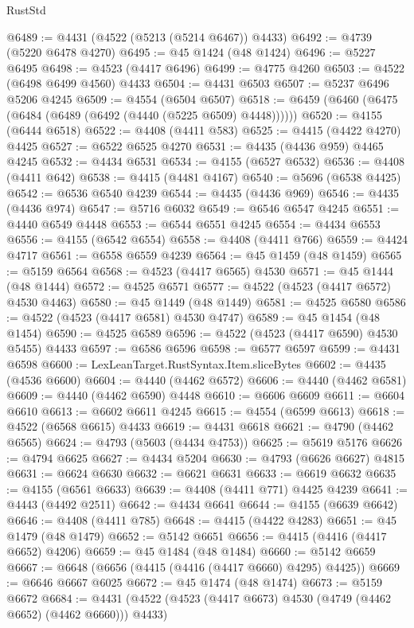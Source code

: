 \begin{lexlean}{RustStd}
\begin{coremodule}
@6489 := @4431 (@4522 (@5213 (@5214 @6467)) @4433)
@6492 := @4739 (@5220 @6478 @4270)
@6495 := @45 @1424 (@48 @1424)
@6496 := @5227 @6495
@6498 := @4523 (@4417 @6496)
@6499 := @4775 @4260
@6503 := @4522 (@6498 @6499 @4560) @4433
@6504 := @4431 @6503
@6507 := @5237 @6496 @5206 @4245
@6509 := @4554 (@6504 @6507)
@6518 := @6459 (@6460 (@6475 (@6484 (@6489 (@6492 (@4440 (@5225 @6509) @4448))))))
@6520 := @4155 (@6444 @6518)
@6522 := @4408 (@4411 @583)
@6525 := @4415 (@4422 @4270) @4425
@6527 := @6522 @6525 @4270
@6531 := @4435 (@4436 @959) @4465 @4245
@6532 := @4434 @6531
@6534 := @4155 (@6527 @6532)
@6536 := @4408 (@4411 @642)
@6538 := @4415 (@4481 @4167)
@6540 := @5696 (@6538 @4425)
@6542 := @6536 @6540 @4239
@6544 := @4435 (@4436 @969)
@6546 := @4435 (@4436 @974)
@6547 := @5716 @6032
@6549 := @6546 @6547 @4245
@6551 := @4440 @6549 @4448
@6553 := @6544 @6551 @4245
@6554 := @4434 @6553
@6556 := @4155 (@6542 @6554)
@6558 := @4408 (@4411 @766)
@6559 := @4424 @4717
@6561 := @6558 @6559 @4239
@6564 := @45 @1459 (@48 @1459)
@6565 := @5159 @6564
@6568 := @4523 (@4417 @6565) @4530
@6571 := @45 @1444 (@48 @1444)
@6572 := @4525 @6571
@6577 := @4522 (@4523 (@4417 @6572) @4530 @4463)
@6580 := @45 @1449 (@48 @1449)
@6581 := @4525 @6580
@6586 := @4522 (@4523 (@4417 @6581) @4530 @4747)
@6589 := @45 @1454 (@48 @1454)
@6590 := @4525 @6589
@6596 := @4522 (@4523 (@4417 @6590) @4530 @5455) @4433
@6597 := @6586 @6596
@6598 := @6577 @6597
@6599 := @4431 @6598
@6600 := LexLeanTarget.RustSyntax.Item.sliceBytes
@6602 := @4435 (@4536 @6600)
@6604 := @4440 (@4462 @6572)
@6606 := @4440 (@4462 @6581)
@6609 := @4440 (@4462 @6590) @4448
@6610 := @6606 @6609
@6611 := @6604 @6610
@6613 := @6602 @6611 @4245
@6615 := @4554 (@6599 @6613)
@6618 := @4522 (@6568 @6615) @4433
@6619 := @4431 @6618
@6621 := @4790 (@4462 @6565)
@6624 := @4793 (@5603 (@4434 @4753))
@6625 := @5619 @5176
@6626 := @4794 @6625
@6627 := @4434 @5204
@6630 := @4793 (@6626 @6627) @4815
@6631 := @6624 @6630
@6632 := @6621 @6631
@6633 := @6619 @6632
@6635 := @4155 (@6561 @6633)
@6639 := @4408 (@4411 @771) @4425 @4239
@6641 := @4443 (@4492 @2511)
@6642 := @4434 @6641
@6644 := @4155 (@6639 @6642)
@6646 := @4408 (@4411 @785)
@6648 := @4415 (@4422 @4283)
@6651 := @45 @1479 (@48 @1479)
@6652 := @5142 @6651
@6656 := @4415 (@4416 (@4417 @6652) @4206)
@6659 := @45 @1484 (@48 @1484)
@6660 := @5142 @6659
@6667 := @6648 (@6656 (@4415 (@4416 (@4417 @6660) @4295) @4425))
@6669 := @6646 @6667 @6025
@6672 := @45 @1474 (@48 @1474)
@6673 := @5159 @6672
@6684 := @4431 (@4522 (@4523 (@4417 @6673) @4530 (@4749 (@4462 @6652) (@4462 @6660))) @4433)

\end{coremodule}
\end{lexlean}
